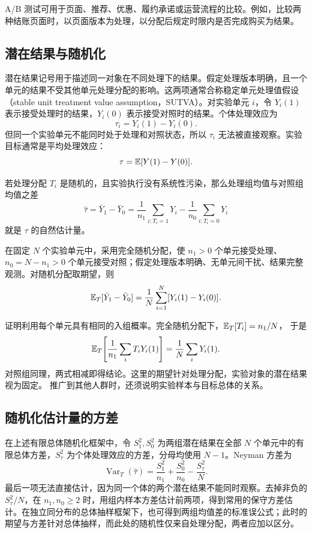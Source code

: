 A/B 测试可用于页面、推荐、优惠、履约承诺或运营流程的比较。例如，比较两种结账页面时，以页面版本为处理，以分配后规定时限内是否完成购买为结果。

\subsection{潜在结果与随机化}

潜在结果记号用于描述同一对象在不同处理下的结果。假定处理版本明确，且一个单元的结果不受其他单元处理分配的影响。这两项通常合称稳定单元处理值假设（stable unit treatment value assumption，SUTVA）。对实验单元 \(i\)，令 \(Y_i(1)\) 表示接受处理时的结果，\(Y_i(0)\) 表示接受对照时的结果。个体处理效应为
\[
  \tau_i=Y_i(1)-Y_i(0).
\]
但同一个实验单元不能同时处于处理和对照状态，所以 \(\tau_i\) 无法被直接观察。实验目标通常是平均处理效应：
\[
  \tau=\mathbb E[Y(1)-Y(0)].
\]

若处理分配 \(T_i\) 是随机的，且实验执行没有系统性污染，那么处理组均值与对照组均值之差
\[
  \hat\tau
  =\bar Y_1-\bar Y_0
  =\frac{1}{n_1}\sum_{i:T_i=1}Y_i
   -\frac{1}{n_0}\sum_{i:T_i=0}Y_i
\]
就是 \(\tau\) 的自然估计量。

\begin{proposition}[随机化差异估计量的无偏性]
在固定 \(N\) 个实验单元中，采用完全随机分配，使 \(n_1>0\) 个单元接受处理、\(n_0=N-n_1>0\) 个单元接受对照；假定处理版本明确、无单元间干扰、结果完整观测。对随机分配取期望，则
\[
  \mathbb E_T[\bar Y_1-\bar Y_0]=\frac1N\sum_{i=1}^N[Y_i(1)-Y_i(0)].
\]
\end{proposition}

证明利用每个单元具有相同的入组概率。完全随机分配下，\(\mathbb E_T[T_i]=n_1/N\)，
于是
\[
\mathbb E_T\!\left[\frac{1}{n_1}\sum_iT_iY_i(1)\right]
=\frac{1}{N}\sum_iY_i(1).
\]
对照组同理，两式相减即得结论。这里的期望针对处理分配，实验对象的潜在结果视为固定。
推广到其他人群时，还须说明实验样本与目标总体的关系。

\subsection{随机化估计量的方差}
在上述有限总体随机化框架中，令 \(S_1^2,S_0^2\) 为两组潜在结果在全部 \(N\) 个单元中的有限总体方差，\(S_\tau^2\) 为个体处理效应的方差，分母均使用 \(N-1\)。Neyman 方差为
\[
\operatorname{Var}_T(\hat\tau)
=\frac{S_1^2}{n_1}+\frac{S_0^2}{n_0}-\frac{S_\tau^2}{N}.
\]
最后一项无法直接估计，因为同一个体的两个潜在结果不能同时观察。去掉非负的 \(S_\tau^2/N\)，在 \(n_1,n_0\ge2\) 时，用组内样本方差估计前两项，得到常用的保守方差估计。在独立同分布的总体抽样框架下，也可得到两组均值差的标准误公式；此时的期望与方差针对总体抽样，而此处的随机性仅来自处理分配，两者应加以区分。

